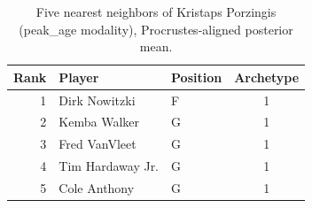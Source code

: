 \begin{table}[htbp]
  \centering\small
  \begin{tabular}{rllc}
    \toprule
    Rank & Player & Position & Archetype \\
    \midrule
    1 & Dirk Nowitzki & F & 1 \\
    2 & Kemba Walker & G & 1 \\
    3 & Fred VanVleet & G & 1 \\
    4 & Tim Hardaway Jr. & G & 1 \\
    5 & Cole Anthony & G & 1 \\
    \bottomrule
  \end{tabular}
  \caption{Five nearest neighbors of Kristaps Porzingis (peak_age modality), Procrustes-aligned posterior mean.}
  \label{tab:Kristaps_Porzingis_neighbors_peak_age}
\end{table}

